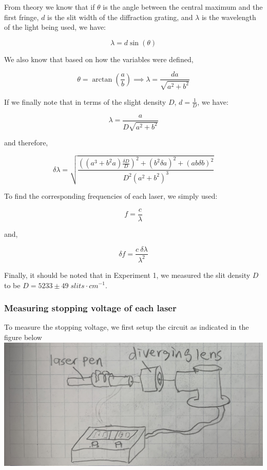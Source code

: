 \documentclass[11pt]{article}
\makeatletter
\def\maxwidth{\ifdim\Gin@nat@width>\linewidth\linewidth
    \else\Gin@nat@width\fi}
\let\Oldincludegraphics\includegraphics
\renewcommand{\includegraphics}[1]{\Oldincludegraphics[width=.8\maxwidth]{#1}}
\makeatother
\begin{document}
From theory we know that if \(\theta\) is the angle between the central
maximum and the first fringe, \(d\) is the slit width of the diffraction
grating, and \(\lambda\) is the wavelength of the light being used, we
have:

\[\lambda = d\sin(\theta) \]

We also know that based on how the variables were defined,

\[ \theta = \arctan \left(\frac{a}{b}\right) \implies \lambda = \frac{da}{\sqrt{a^2 + b^2}}\]

If we finally note that in terms of the slight density \(D\),
\(d = \frac{1}{D}\), we have:

\[\lambda = \frac{a}{D\sqrt{a^2 + b^2}}\]

and therefore,

\[\delta\lambda = \sqrt{\dfrac{\left((a^{3} + b^{2}a)\frac{\delta D}{D}\right)^{2} + (b^{2}\delta a)^{2} + (ab\delta b)^{2}}{D^{2}(a^{2}+b^{2})^{3}}}\]

To find the corresponding frequencies of each laser, we simply used:

\[ f= \frac{c}{\lambda}\]

and,

\[ \delta f = \frac{c \: \delta\lambda}{\lambda^2}\]

Finally, it should be noted that in Experiment 1, we measured the slit
density \(D\) to be \(D = 5233 \pm 49 \; slits \cdot cm^{-1}\).

    \hypertarget{measuring-stopping-voltage-of-each-laser}{%
\subsubsection{Measuring stopping voltage of each
laser}\label{measuring-stopping-voltage-of-each-laser}}

To measure the stopping voltage, we first setup the circuit as indicated
in the figure below \includegraphics{fig2.jpg}
\end{document}
